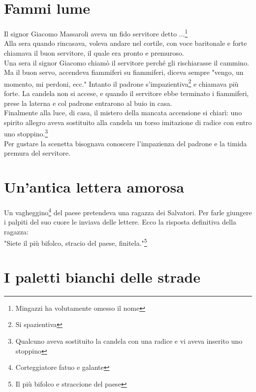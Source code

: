 \documentclass[10pt]{memoir} %
\begin{document}
\chapter{Fammi lume}
Il signor Giacomo Massaroli aveva un fido servitore detto ...\footnote{Mingazzi ha volutamente omesso il nome}\\
Alla sera quando rincasava, voleva andare nel cortile, con voce baritonale e forte chiamava il buon servitore, il quale era pronto e premuroso.\\
Una sera il signor Giacomo chiamò il servitore perché gli rischiarasse il cammino. Ma il buon servo, accendeva fiammiferi su fiammiferi, diceva sempre "vengo, un momento, mi perdoni, ecc." Intanto il padrone s'impazientiva\footnote{Si spazientiva} e chiamava più forte. La candela non si accese, e quando il servitore ebbe terminato i fiammiferi, prese la laterna e col padrone entrarono al buio in casa.\\
Finalmente alla luce, di casa, il mistero della mancata accensione si chiarì: uno spirito allegro aveva sostituito alla candela un torso imitazione di radice con entro uno stoppino.\footnote{Qualcuno aveva sostituito la candela con una radice e vi aveva inserito uno stoppino}\\
Per gustare la scenetta bisognava conoscere l'impazienza del padrone e la timida premura del servitore.



\chapter{Un'antica lettera amorosa}
Un vagheggino\footnote{Corteggiatore fatuo e galante} del paese pretendeva una ragazza dei Salvatori. Per farle giungere i palpiti del suo cuore le inviava delle lettere. Ecco la risposta definitiva della ragazza:
\\ "Siete il più bifolco, stracio del paese, finitela."\footnote{Il più bifolco e straccione del paese} 

\chapter{I paletti bianchi delle strade}
\end{document}
